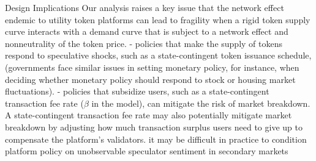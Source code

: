 Design Implications
Our analysis raises a key issue that the network effect endemic to utility token platforms can lead to fragility when a rigid token supply curve interacts with a demand curve that is subject to a network effect and nonneutrality of the token price.
  - policies that make the supply of tokens respond to speculative shocks, such as a state-contingent token issuance schedule, (governments face similar issues in setting monetary policy, for instance, when deciding whether monetary policy should respond to stock or housing market fluctuations).
  - policies that subsidize users, such as a state-contingent transaction fee rate ($\beta$ in the model), can mitigate the risk of market breakdown.  A state-contingent transaction fee rate may also potentially mitigate market breakdown by adjusting how much transaction surplus users need to give up to compensate the platform's validators. it may be difficult in practice to condition
platform policy on unobservable speculator sentiment in secondary markets
